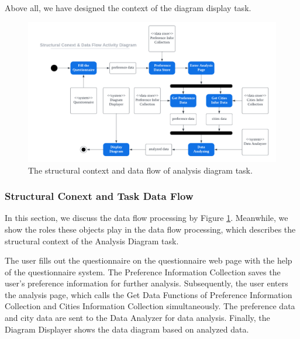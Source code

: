 \documentclass[conference]{IEEEtran}
\begin{document}
Above all, we have designed the context of the diagram display task.



\begin{figure}[htbp]
\centerline{\includegraphics[width=1.0\textwidth]{diagram_data_flow.pdf}}
\caption{The structural context and data flow of analysis diagram task.}
\label{diagram_data_flow}
\end{figure}

\subsubsection{\textbf{Structural Conext and Task Data Flow}}

\textbf{}

In this section, we discuss the data flow processing by Figure \ref{diagram_data_flow}. Meanwhile, we show the roles these objects play in the data flow processing, which describes the structural context of the Analysis Diagram task.

The user fills out the questionnaire on the questionnaire web page with the help of the questionnaire system. The Preference Information Collection saves the user's preference information for further analysis. Subsequently, the user enters the analysis page, which calls the Get Data Functions of Preference Information Collection and Cities Information Collection simultaneously. The preference data and city data are sent to the Data Analyzer for data analysis. Finally, the Diagram Displayer shows the data diagram based on analyzed data.
\end{document}
